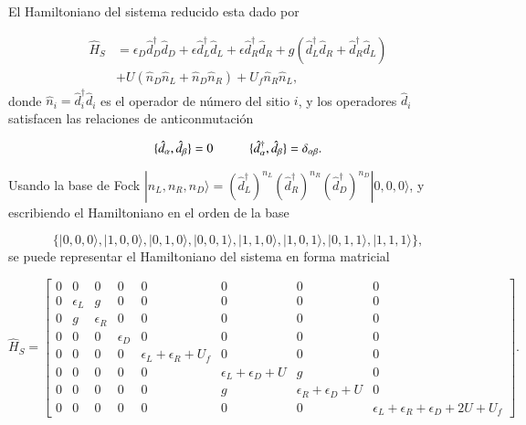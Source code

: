 
El Hamiltoniano del sistema reducido esta dado por 

\begin{align*}
    \hat{H}_{S} & = \epsilon_{D}\hat{d}^{\dagger}_{D}\hat{d}_{D} + \epsilon \hat{d}^{\dagger}_{L}\hat{d}_{L} + \epsilon \hat{d}^{\dagger}_{R}\hat{d}_{R} + g(\hat{d}^{\dagger}_{L}\hat{d}_{R} + \hat{d}^{\dagger}_{R}\hat{d}_{L} ) \\
          & + U(\hat{n}_{D}\hat{n}_{L} + \hat{n}_{D}\hat{n}_{R} )  + U_{f}\hat{n}_{R}\hat{n}_{L},
\end{align*}
donde $\hat{n}_{i} = \hat{d}^{\dagger}_{i} \hat{d}_{i}$ es el operador de número del sitio $i$, y los operadores $\hat{d}_{i}$ satisfacen las relaciones de anticonmutación

\begin{equation*}
    \{\hat{d}_{\alpha},\hat{d}_{\beta} \} = 0  \hspace{10mm} \{\hat{d}^{\dagger}_{\alpha}, \hat{d}_{\beta} \} = \delta_{\alpha \beta}.
\end{equation*}

Usando la base de Fock $|n_{L},n_{R},n_{D} \rangle = (\hat{d}^{\dagger}_{L})^{n_{L}}(\hat{d}^{\dagger}_{R})^{n_{R}}(\hat{d}^{\dagger}_{D})^{n_{D}}|0,0,0\rangle$, y escribiendo el Hamiltoniano en el orden de la base 

\begin{equation*}
     \{|0,0,0\rangle, |1,0,0\rangle, |0,1,0\rangle, |0,0,1\rangle, |1,1,0\rangle, |1,0,1\rangle, |0,1,1\rangle, |1,1,1\rangle\},
\end{equation*}
se puede representar el Hamiltoniano del sistema en forma matricial 

\begin{equation*}
    \hat{H}_{S} = 
    \begin{bmatrix}
        0 & 0 & 0 & 0 & 0 & 0 & 0 & 0 \\
        0 & \epsilon_{L} & g & 0 & 0 & 0 & 0 & 0 \\
        0 & g & \epsilon_{R} & 0 & 0 & 0 & 0 & 0 \\
        0 & 0 & 0 & \epsilon_{D} & 0 & 0 & 0 & 0 \\
        0 & 0 & 0 & 0 & \epsilon_{L} + \epsilon_{R}  + U_{f} & 0 & 0 & 0 \\
        0 & 0 & 0 & 0 & 0 & \epsilon_{L} + \epsilon_{D} + U & g & 0 \\
        0 & 0 & 0 & 0 & 0 & g & \epsilon_{R} + \epsilon_{D} + U & 0 \\
        0 & 0 & 0 & 0 & 0 & 0 & 0 & \epsilon_{L} + \epsilon_{R}  + \epsilon_{D} + 2U + U_{f} 
        \end{bmatrix}.
\end{equation*}

